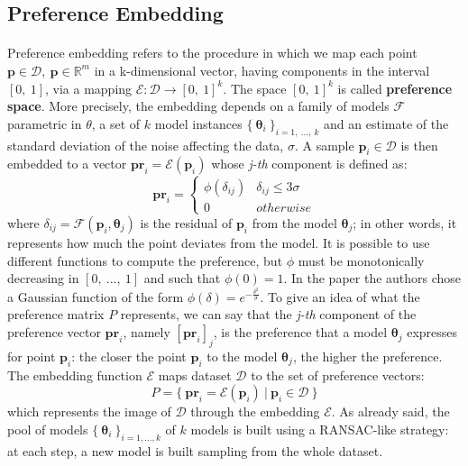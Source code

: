 \subsection{Preference Embedding}
\label{subsec:preference_embedding}
\paragraph{}
Preference embedding refers to the procedure in which we map each point $\textbf{p} \in \mathcal{D},\ \textbf{p} \in \mathbb{R}^m$ in a k-dimensional vector, having components in the interval $[0,\ 1]$, via a mapping $\mathcal{E}: \mathcal{D} \rightarrow [0,\ 1]^k$. The space $[0,\ 1]^k$ is called \textbf{preference space}. \newline
More precisely, the embedding depends on a family of models $\mathcal{F}$ parametric in \textbf{$\theta$}, a set of $k$ model instances $\{\ \bm{\theta}_i\ \}_{i=1,\ ...,\ k}$ and an estimate of the standard deviation of the noise affecting the data, $\sigma$. \newline
A sample $\textbf{p}_i \in \mathcal{D}$ is then embedded to a vector $\textbf{pr}_i = \mathcal{E}(\textbf{p}_i)$ whose \textit{j-th} component is defined as:
\begin{equation}
\label{eq:preference_embedding}
    \textbf{pr}_i = \begin{cases} 
                      \phi(\delta_{ij}) & \delta_{ij} \leq 3\sigma \\
                      0 & otherwise
                   \end{cases}
\end{equation}
where $\delta_{ij} = \mathcal{F}(\textbf{p}_i, \bm{\theta}_j)$ is the residual of $\textbf{p}_i$ from the model $\bm{\theta}_j$; in other words, it represents how much the point deviates from the model. It is possible to use different functions to compute the preference, but $\phi$ must be monotonically decreasing in $[0,\ ...,\ 1]$ and such that $\phi(0) = 1$. In the paper the authors chose a Gaussian function of the form $\phi(\delta) = e^{ -\frac{\delta^2}{\sigma}}$. \newline
To give an idea of what the preference matrix $P$ represents, we can say that the \textit{j-th} component of the preference vector $\textbf{pr}_i$, namely $[\textbf{pr}_i]_j$, is the preference that a model $\bm{\theta}_j$ expresses for point $\textbf{p}_i$: the closer the point $\textbf{p}_i$ to the model $\bm{\theta}_j$, the higher the preference. The embedding function $\mathcal{E}$ maps dataset $\mathcal{D}$ to the set of preference vectors:
\[
    P = \{\ \textbf{pr}_i = \mathcal{E}(\textbf{p}_i)\ |\ \textbf{p}_i \in \mathcal{D}\ \}
\]
which represents the image of $\mathcal{D}$ through the embedding $\mathcal{E}$. As already said, the pool of models $\{\ \bm{\theta}_i\ \}_{i=1,...,k}$ of $k$ models is built using a RANSAC-like strategy: at each step, a new model is built sampling from the whole dataset.

